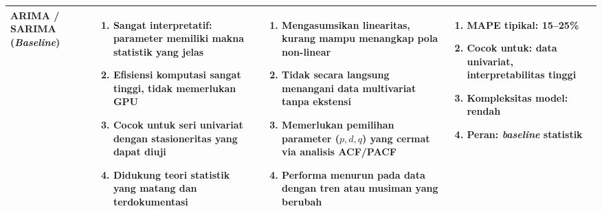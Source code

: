 \begin{longtable}{|p{1.8cm}|p{3.5cm}|p{3.8cm}|p{3cm}|}
\textbf{ARIMA / SARIMA} (\textit{Baseline}) &
\begin{enumerate}[leftmargin=*,itemsep=0.5pt,topsep=1pt,partopsep=0pt]
  \item Sangat interpretatif: parameter memiliki makna statistik yang jelas
  \item Efisiensi komputasi sangat tinggi, tidak memerlukan GPU
  \item Cocok untuk seri univariat dengan stasioneritas yang dapat diuji
  \item Didukung teori statistik yang matang dan terdokumentasi
\end{enumerate}
&
\begin{enumerate}[leftmargin=*,itemsep=0.5pt,topsep=1pt,partopsep=0pt]
  \item Mengasumsikan linearitas, kurang mampu menangkap pola non-linear
  \item Tidak secara langsung menangani data multivariat tanpa ekstensi
  \item Memerlukan pemilihan parameter (\(p, d, q\)) yang cermat via analisis ACF/PACF
  \item Performa menurun pada data dengan tren atau musiman yang berubah
\end{enumerate}
&
\begin{enumerate}[leftmargin=*,itemsep=0.5pt,topsep=1pt,partopsep=0pt]
  \item MAPE tipikal: 15--25\%
  \item Cocok untuk: data univariat, interpretabilitas tinggi
  \item Kompleksitas model: rendah
  \item Peran: \textit{baseline} statistik
\end{enumerate}
\tabularnewline
\hline


\end{longtable}
